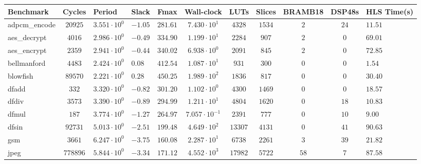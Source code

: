 \begin{tabular}{|l|c|HHc|c|c|c|c|cH|}
\hline
Benchmark     & Cycles       & Period                 & Slack     & Fmax       & Wall-clock              & LUTs      & Slices    & BRAMB18 & DSP48s  & HLS Time(s) \\
\hline
adpcm\_encode & $ 20925    $ & $ 3.551 \cdot 10^{0} $ & $ -1.05 $ & $ 281.61 $ & $ 7.430 \cdot 10^{1}  $ & $ 4328  $ & $ 1534  $ & $ 2   $ & $ 24  $ & $ 11.51   $ \\
aes\_decrypt  & $ 4016     $ & $ 2.986 \cdot 10^{0} $ & $ -0.49 $ & $ 334.90 $ & $ 1.199 \cdot 10^{1}  $ & $ 2284  $ & $ 907   $ & $ 2   $ & $ 0   $ & $ 69.01   $ \\
aes\_encrypt  & $ 2359     $ & $ 2.941 \cdot 10^{0} $ & $ -0.44 $ & $ 340.02 $ & $ 6.938 \cdot 10^{0}  $ & $ 2091  $ & $ 845   $ & $ 2   $ & $ 0   $ & $ 72.85   $ \\
bellmanford   & $ 4483     $ & $ 2.424 \cdot 10^{0} $ & $ 0.08  $ & $ 412.54 $ & $ 1.087 \cdot 10^{1}  $ & $ 931   $ & $ 300   $ & $ 0   $ & $ 0   $ & $ 1.54    $ \\
blowfish      & $ 89570    $ & $ 2.221 \cdot 10^{0} $ & $ 0.28  $ & $ 450.25 $ & $ 1.989 \cdot 10^{2}  $ & $ 1836  $ & $ 817   $ & $ 0   $ & $ 0   $ & $ 30.40   $ \\
dfadd         & $ 332      $ & $ 3.320 \cdot 10^{0} $ & $ -0.82 $ & $ 301.20 $ & $ 1.102 \cdot 10^{0}  $ & $ 4300  $ & $ 1469  $ & $ 0   $ & $ 0   $ & $ 18.57   $ \\
dfdiv         & $ 3573     $ & $ 3.390 \cdot 10^{0} $ & $ -0.89 $ & $ 294.99 $ & $ 1.211 \cdot 10^{1}  $ & $ 4804  $ & $ 1620  $ & $ 0   $ & $ 18  $ & $ 10.83   $ \\
dfmul         & $ 187      $ & $ 3.774 \cdot 10^{0} $ & $ -1.27 $ & $ 264.97 $ & $ 7.057 \cdot 10^{-1} $ & $ 2391  $ & $ 777   $ & $ 0   $ & $ 10  $ & $ 9.00    $ \\
dfsin         & $ 92731    $ & $ 5.013 \cdot 10^{0} $ & $ -2.51 $ & $ 199.48 $ & $ 4.649 \cdot 10^{2}  $ & $ 13307 $ & $ 4131  $ & $ 0   $ & $ 41  $ & $ 90.63   $ \\
gsm           & $ 3661     $ & $ 6.247 \cdot 10^{0} $ & $ -3.75 $ & $ 160.08 $ & $ 2.287 \cdot 10^{1}  $ & $ 6738  $ & $ 2261  $ & $ 3   $ & $ 39  $ & $ 21.82   $ \\
jpeg          & $ 778896   $ & $ 5.844 \cdot 10^{0} $ & $ -3.34 $ & $ 171.12 $ & $ 4.552 \cdot 10^{3}  $ & $ 17982 $ & $ 5722  $ & $ 58  $ & $ 7   $ & $ 87.58   $ \\

\end{tabular}
